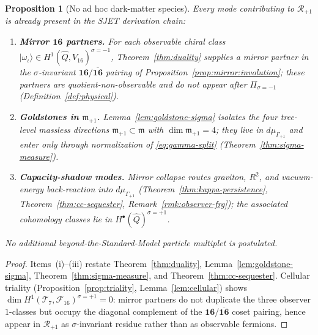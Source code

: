 \documentclass[aps,prd,onecolumn,amsmath,amssymb,nofootinbib,11pt]{revtex4-2}
\numberwithin{equation}{section}
\theoremstyle{plain}
\newtheorem{proposition}[theorem]{Proposition}
\theoremstyle{definition}
\theoremstyle{remark}
\begin{document}
\begin{proposition}[No ad hoc dark-matter species]\label{prop:dm-no-new}
Every mode contributing to $\mathcal{R}_{+1}$ is already present in the
SJET derivation chain:
\begin{enumerate}[label=(\roman*),leftmargin=*]
  \item \textbf{Mirror $\mathbf{16}$ partners.} For each observable chiral
    class $|\omega_\iota\rangle\in H^1(\hat Q,V_{16})^{\sigma=-1}$,
    Theorem~\ref{thm:duality} supplies a mirror partner in the
    $\sigma$-invariant $\mathbf{16}/\overline{\mathbf{16}}$ pairing of
    Proposition~\ref{prop:mirror:involution}; these partners are
    quotient-non-observable and do not appear after
    $\Pi_{\sigma=-1}$ (Definition~\ref{def:physical}).
  \item \textbf{Goldstones in $\mathfrak{m}_{+1}$.} Lemma~\ref{lem:goldstone-sigma}
    isolates the four tree-level massless directions
    $\mathfrak{m}_{+1}\subset\mathfrak{m}$ with
    $\dim\mathfrak{m}_{+1}=4$; they live in $d\mu_{\Gamma_{+1}}$ and enter
    only through normalization of \eqref{eq:gamma-split}
    (Theorem~\ref{thm:sigma-measure}).
  \item \textbf{Capacity-shadow modes.} Mirror collapse routes graviton,
    $R^2$, and vacuum-energy back-reaction into $d\mu_{\Gamma_{+1}}$
    (Theorem~\ref{thm:kappa-persistence}, Theorem~\ref{thm:cc-sequester},
    Remark~\ref{rmk:observer-frg}); the associated cohomology classes lie in
    $H^\bullet(\hat Q)^{\sigma=+1}$.
\end{enumerate}
No additional beyond-the-Standard-Model particle multiplet is postulated.
\end{proposition}

\begin{proof}
Items~(i)--(iii) restate Theorem~\ref{thm:duality},
Lemma~\ref{lem:goldstone-sigma}, Theorem~\ref{thm:sigma-measure}, and
Theorem~\ref{thm:cc-sequester}. Cellular triality
(Proposition~\ref{prop:triality}, Lemma~\ref{lem:cellular}) shows
$\dim H^1(\mathcal{T}_7,\mathcal{F}_{16})^{\sigma=+1}=0$: mirror partners do
not duplicate the three observer $1$-classes but occupy the diagonal complement
of the $\mathbf{16}/\overline{\mathbf{16}}$ coset pairing, hence appear in
$\mathcal{R}_{+1}$ as $\sigma$-invariant residue rather than as observable
fermions.
\end{proof}
\end{document}
